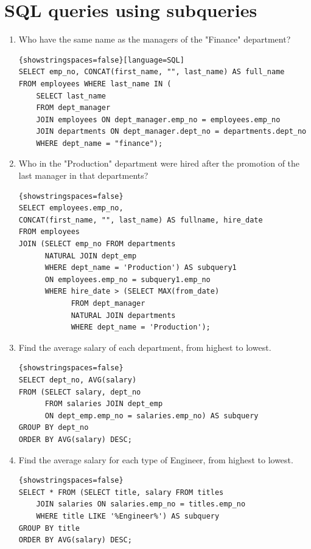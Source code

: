 \documentclass{article}
\begin{document}
\section*{SQL queries using subqueries}
\begin{enumerate}
	\item Who have the same name as the managers of the "Finance" department?\\
	\begin{lstlisting}{showstringspaces=false}[language=SQL]
SELECT emp_no, CONCAT(first_name, "", last_name) AS full_name 
FROM employees WHERE last_name IN (
	SELECT last_name 
    FROM dept_manager 
    JOIN employees ON dept_manager.emp_no = employees.emp_no
    JOIN departments ON dept_manager.dept_no = departments.dept_no
	WHERE dept_name = "finance");
	\end{lstlisting}
	
	\item Who in the "Production" department were hired after the promotion of the last manager in that departments?\\
	\begin{lstlisting}{showstringspaces=false}
SELECT employees.emp_no,
CONCAT(first_name, "", last_name) AS fullname, hire_date
FROM employees 
JOIN (SELECT emp_no FROM departments 
	  NATURAL JOIN dept_emp
	  WHERE dept_name = 'Production') AS subquery1
	  ON employees.emp_no = subquery1.emp_no
	  WHERE hire_date > (SELECT MAX(from_date)
	  		FROM dept_manager 
	  		NATURAL JOIN departments
			WHERE dept_name = 'Production');
	\end{lstlisting}
	
	
	\item Find the average salary of each department, from highest to lowest.	
	\begin{lstlisting}{showstringspaces=false}
SELECT dept_no, AVG(salary)
FROM (SELECT salary, dept_no 
	  FROM salaries JOIN dept_emp 
	  ON dept_emp.emp_no = salaries.emp_no) AS subquery
GROUP BY dept_no
ORDER BY AVG(salary) DESC;

	\end{lstlisting}
	
	\item Find the average salary for each type of Engineer, from highest to lowest.
	
	\begin{lstlisting}{showstringspaces=false}
SELECT * FROM (SELECT title, salary FROM titles
	JOIN salaries ON salaries.emp_no = titles.emp_no
	WHERE title LIKE '%Engineer%') AS subquery
GROUP BY title
ORDER BY AVG(salary) DESC;
	\end{lstlisting}
		
\end{enumerate}
\end{document}
